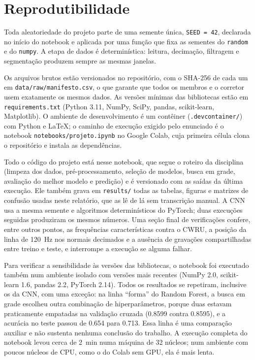 \section{Reprodutibilidade}
\label{sec:reprodutibilidade}

Toda aleatoriedade do projeto parte de uma semente única, \texttt{SEED = 42},
declarada no início do notebook e aplicada por uma função que fixa as sementes
do \texttt{random} e do \texttt{numpy}. A etapa de dados é determinística:
leitura, decimação, filtragem e segmentação produzem sempre as mesmas janelas.

Os arquivos brutos estão versionados no repositório, com o SHA-256 de cada um em
\texttt{data/raw/manifesto.csv}, o que garante que todos os membros e o corretor
usem exatamente os mesmos dados. As versões mínimas das bibliotecas estão em
\texttt{requirements.txt} (Python 3.11, NumPy, SciPy, pandas, scikit-learn,
Matplotlib). O ambiente de desenvolvimento é um contêiner
(\texttt{.devcontainer/}) com Python e \LaTeX; o caminho de execução exigido pelo
enunciado é o notebook \texttt{notebooks/projeto.ipynb} no Google Colab, cuja
primeira célula clona o repositório e instala as dependências.

Todo o código do projeto está nesse notebook, que segue o roteiro da disciplina
(limpeza dos dados, pré-processamento, seleção de modelos, busca em grade,
avaliação do melhor modelo e predição) e é versionado com as saídas da última
execução. Ele também grava em \texttt{results/} todas as tabelas, figuras e
matrizes de confusão usadas neste relatório, que as lê de lá sem transcrição
manual. A CNN usa a mesma semente e algoritmos determinísticos do PyTorch; duas
execuções seguidas produziram os mesmos números. Uma seção final de verificações
confere, entre outros pontos, as frequências características contra o CWRU, a
posição da linha de \SI{120}{\hertz} nos normais decimados e a ausência de
gravações compartilhadas entre treino e teste, e interrompe a execução se alguma
falhar.

Para verificar a sensibilidade às versões das bibliotecas, o notebook foi
executado também num ambiente isolado com versões mais recentes (NumPy 2.0,
scikit-learn 1.6, pandas 2.2, PyTorch 2.14). Todos os resultados se repetiram,
inclusive os da CNN, com uma exceção: na linha ``forma'' do Random Forest, a busca
em grade escolheu outra combinação de hiperparâmetros, porque duas estavam
praticamente empatadas na validação cruzada (\num{0.8599} contra \num{0.8595}),
e a acurácia no teste passou de \num{0.654} para \num{0.713}. Essa linha é uma
comparação auxiliar e não sustenta nenhuma conclusão do trabalho. A execução completa do
notebook levou cerca de \SI{2}{\minute} numa máquina de 32 núcleos; num ambiente
com poucos núcleos de CPU, como o do Colab sem GPU, ela é mais lenta.
